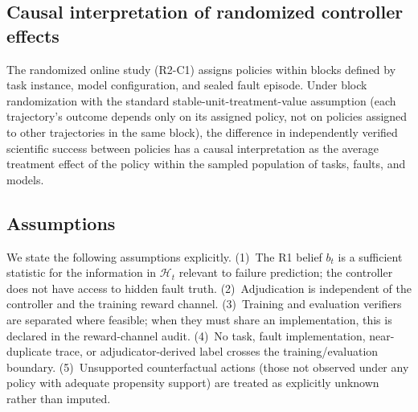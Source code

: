 \subsection{Causal interpretation of randomized controller effects}

The randomized online study (R2-C1) assigns policies within blocks defined
by task instance, model configuration, and sealed fault episode. Under
block randomization with the standard stable-unit-treatment-value
assumption (each trajectory's outcome depends only on its assigned policy,
not on policies assigned to other trajectories in the same block), the
difference in independently verified scientific success between policies
has a causal interpretation as the average treatment effect of the policy
within the sampled population of tasks, faults, and models.

\subsection{Assumptions}

We state the following assumptions explicitly. (1)~The R1 belief $b_t$ is a
sufficient statistic for the information in $\mathcal{H}_t$ relevant to
failure prediction; the controller does not have access to hidden fault
truth. (2)~Adjudication is independent of the controller and the training
reward channel. (3)~Training and evaluation verifiers are separated where
feasible; when they must share an implementation, this is declared in the
reward-channel audit. (4)~No task, fault implementation, near-duplicate
trace, or adjudicator-derived label crosses the training/evaluation
boundary. (5)~Unsupported counterfactual actions (those not observed under
any policy with adequate propensity support) are treated as explicitly
unknown rather than imputed.
